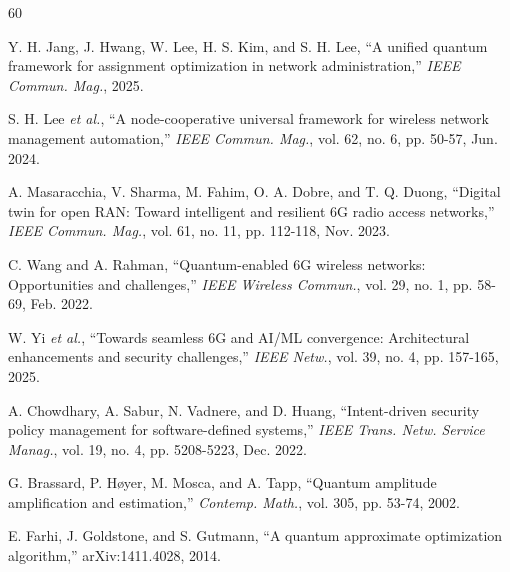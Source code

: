 \documentclass[journal]{IEEEtran}
\begin{document}
\begin{thebibliography}{60}

Y. H. Jang, J. Hwang, W. Lee, H. S. Kim, and S. H. Lee, ``A unified
quantum framework for assignment optimization in network
administration,'' \emph{IEEE Commun. Mag.}, 2025.

S. H. Lee \emph{et al.}, ``A node-cooperative universal framework
for wireless network management automation,'' \emph{IEEE Commun.
Mag.}, vol. 62, no. 6, pp. 50-57, Jun. 2024.

A. Masaracchia, V. Sharma, M. Fahim, O. A. Dobre, and T. Q. Duong,
``Digital twin for open RAN: Toward intelligent and resilient 6G
radio access networks,'' \emph{IEEE Commun. Mag.}, vol. 61, no. 11,
pp. 112-118, Nov. 2023.

C. Wang and A. Rahman, ``Quantum-enabled 6G wireless networks:
Opportunities and challenges,'' \emph{IEEE Wireless Commun.},
vol. 29, no. 1, pp. 58-69, Feb. 2022.

W. Yi \emph{et al.}, ``Towards seamless 6G and AI/ML convergence:
Architectural enhancements and security challenges,'' \emph{IEEE
Netw.}, vol. 39, no. 4, pp. 157-165, 2025.

A. Chowdhary, A. Sabur, N. Vadnere, and D. Huang, ``Intent-driven
security policy management for software-defined systems,''
\emph{IEEE Trans. Netw. Service Manag.}, vol. 19, no. 4,
pp. 5208-5223, Dec. 2022.

G. Brassard, P. H\o yer, M. Mosca, and A. Tapp, ``Quantum amplitude
amplification and estimation,'' \emph{Contemp. Math.}, vol. 305,
pp. 53-74, 2002.

E. Farhi, J. Goldstone, and S. Gutmann, ``A quantum approximate
optimization algorithm,'' arXiv:1411.4028, 2014.


\end{thebibliography}
\end{document}
